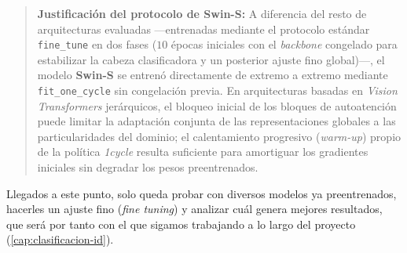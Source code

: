 \begin{quote}
\small \textbf{Justificación del protocolo de Swin-S:} A diferencia del resto de arquitecturas evaluadas ---entrenadas mediante el protocolo estándar \texttt{fine\_tune} en dos fases ($10$ épocas iniciales con el \textit{backbone} congelado para estabilizar la cabeza clasificadora y un posterior ajuste fino global)---, el modelo \textbf{Swin-S} se entrenó directamente de extremo a extremo mediante \texttt{fit\_one\_cycle} sin congelación previa. En arquitecturas basadas en \textit{Vision Transformers} jerárquicos, el bloqueo inicial de los bloques de autoatención puede limitar la adaptación conjunta de las representaciones globales a las particularidades del dominio; el calentamiento progresivo (\textit{warm-up}) propio de la política \textit{1cycle} resulta suficiente para amortiguar los gradientes iniciales sin degradar los pesos preentrenados.
\end{quote}


Llegados a este punto, solo queda probar con diversos modelos ya preentrenados, hacerles un ajuste fino (\emph{fine tuning}) y analizar cuál genera mejores resultados, que será por tanto con el que sigamos trabajando a lo largo del proyecto (\cref{cap:clasificacion-id}).

\endinput

